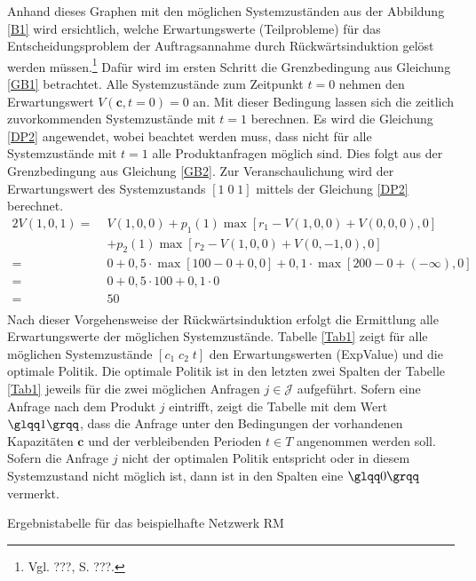 Anhand dieses Graphen mit den möglichen Systemzuständen aus der Abbildung \ref{B1} wird ersichtlich, welche Erwartungswerte (Teilprobleme) für das Entscheidungsproblem der Auftragsannahme durch Rückwärtsinduktion gelöst werden müssen.\footnote{Vgl. ???, S. ???.} Dafür wird im ersten Schritt die Grenzbedingung aus Gleichung \eqref{GB1} betrachtet. Alle Systemzustände zum Zeitpunkt $t=0$ nehmen den Erwartungswert $V(\textbf{c}, t=0)=0$ an. Mit dieser Bedingung lassen sich die zeitlich zuvorkommenden Systemzustände mit $t=1$ berechnen. Es wird die Gleichung \eqref{DP2} angewendet, wobei beachtet werden muss, dass nicht für alle Systemzustände mit $t=1$ alle Produktanfragen möglich sind. Dies folgt aus der Grenzbedingung aus Gleichung \eqref{GB2}. Zur Veranschaulichung wird der Erwartungswert des Systemzustands $[1\;0\;1]$ mittels der Gleichung \eqref{DP2} berechnet.
\begin{alignat*}{2}
V(1,0,1)=\;&V(1,0,0)+p_{1}(1)\max[r_{1}-V(1,0,0)+V(0,0,0),0]\\
&+p_{2}(1)\max[r_{2}-V(1,0,0)+V(0,-1,0),0]\\
=\;&0+0,5\cdot\max[100-0+0,0]+0,1\cdot\max[200-0+(-\infty),0]\\
=\;&0+0,5\cdot 100+0,1\cdot0\\
=\;&50\\
\end{alignat*}
Nach dieser Vorgehensweise der Rückwärtsinduktion erfolgt die Ermittlung alle Erwartungswerte der möglichen Systemzustände. Tabelle \ref{Tab1} zeigt für alle möglichen Systemzustände $[c_1\;c_2\;t]$ den Erwartungswerten (ExpValue) und die optimale Politik. Die optimale Politik ist in den letzten zwei Spalten der Tabelle \ref{Tab1} jeweils für die zwei möglichen Anfragen $j\in\mathcal{J}$ aufgeführt. Sofern eine Anfrage nach dem Produkt $j$ eintrifft, zeigt die Tabelle mit dem Wert $\glqq 1\grqq$, dass die Anfrage unter den Bedingungen der vorhandenen Kapazitäten $\textbf{c}$ und der verbleibenden Perioden $t\in T$ angenommen werden soll. Sofern die Anfrage $j$ nicht der optimalen Politik entspricht oder in diesem Systemzustand nicht möglich ist, dann ist in den Spalten eine $\glqq 0\grqq$ vermerkt.
\begin{table}
\begin{footnotesize}
    \caption{Ergebnistabelle für das beispielhafte Netzwerk RM} \label{Tab1}
    \vspace*{3mm}
    \begin{center}
            \end{center}
\end{footnotesize}
\end{table}

